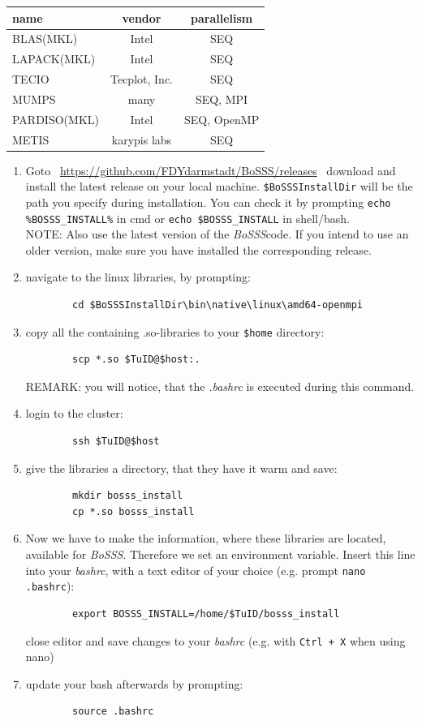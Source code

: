 \documentclass[11pt,twoside,a4paper]{fdyartcl}
\newcommand{\Bosss}{\textit{BoSSS}}
\begin{document}
\begin{table}[h]
	\centering
	\begin{tabular}{l|c|c}
		name & vendor & parallelism \\
		\hline
		BLAS(MKL) & Intel & SEQ \\
		LAPACK(MKL) & Intel & SEQ \\
		TECIO & Tecplot, Inc. & SEQ \\
		MUMPS & many & SEQ, MPI \\
		PARDISO(MKL) & Intel & SEQ, OpenMP \\
		METIS & karypis labs & SEQ
	\end{tabular}
\end{table}



\begin{enumerate}
	\item Goto \ \url{https://github.com/FDYdarmstadt/BoSSS/releases} \ download and install the latest release on your local machine. \verb|$BoSSSInstallDir| will be the path you specify during installation. You can check it by prompting \verb|echo %BOSSS_INSTALL%| in cmd or \verb|echo $BOSSS_INSTALL| in shell/bash. \\
	NOTE: Also use the latest version of the \Bosss code. If you intend to use an older version, make sure you have installed the corresponding release.
	\item navigate to the linux libraries, by prompting:
	\begin{verbatim}
		cd $BoSSSInstallDir\bin\native\linux\amd64-openmpi
	\end{verbatim}
	\item copy all the containing .so-libraries to your \verb|$home| directory:
	\begin{verbatim}
		scp *.so $TuID@$host:.
	\end{verbatim}
	REMARK: you will notice, that the \textit{.bashrc} is executed during this command.
	\item login to the cluster:
	\begin{verbatim}
		ssh $TuID@$host
	\end{verbatim}
	\item give the libraries a directory, that they have it warm and save:
	\begin{verbatim}
		mkdir bosss_install
		cp *.so bosss_install
	\end{verbatim}
	\item Now we have to make the information, where these libraries are located, available for \Bosss. Therefore we set an environment variable. Insert this line into your \textit{bashrc}, with a text editor of your choice (e.g. prompt \verb|nano .bashrc|):
	\begin{verbatim}
	 	export BOSSS_INSTALL=/home/$TuID/bosss_install
	\end{verbatim}
	close editor and save changes to your \textit{bashrc} (e.g. with \verb|Ctrl + X| when using nano)
	\item update your bash afterwards by prompting:
	\begin{verbatim}
		source .bashrc
	\end{verbatim}
\end{enumerate}
\end{document}
